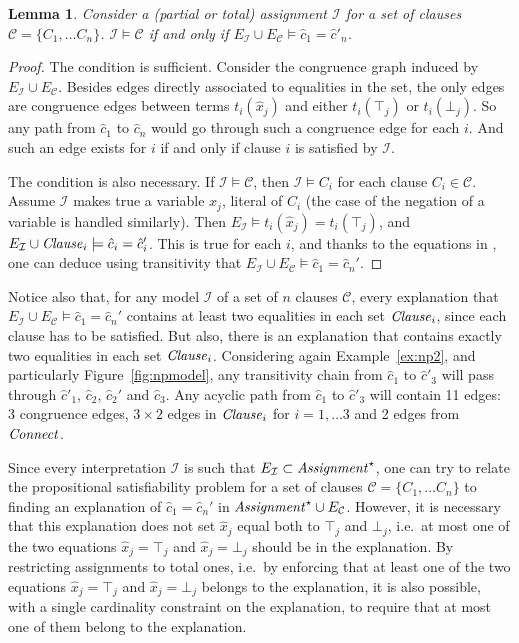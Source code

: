 \documentclass{easychair}
\newtheorem{lemma}{Lemma}
\begin{document}
\begin{lemma}
\label{lemma:eqv}
Consider a (partial or total) assignment $\mathcal{I}$ for a set of clauses
$\mathcal{C}= \{C_1, \dots C_n\}$.  $\mathcal{I} \models \mathcal{C}$ if and only if
$E_{\mathcal{I}} \cup E_\mathcal{C} \models \hat{c}_1 = \hat{c}'_n$.
\end{lemma}
\begin{proof}
The condition is sufficient.  Consider the congruence graph induced by
$E_{\mathcal{I}} \cup E_\mathcal{C}$.  Besides edges directly associated to
equalities in the set, the only edges are congruence edges between terms
$t_i(\hat{x}_j)$ and either $t_i(\top_j)$ or $t_i(\bot_j)$.  So any path from
$\hat{c}_1$ to $\hat{c}_n$ would go through such a congruence edge for each $i$.
And such an edge exists for $i$ if and only if clause $i$ is satisfied by
$\mathcal{I}$.

The condition is also necessary.  If $\mathcal{I} \models \mathcal{C}$, then
$\mathcal{I} \models C_i$ for each clause $C_i \in \mathcal{C}$.  Assume
$\mathcal{I}$ makes true a variable $x_j$, literal of $C_i$ (the case of
the negation of a variable is handled similarly).  Then $E_{\mathcal{I}} \models
t_i(\hat{x}_j) = t_i(\top_j)$, and $E_{\mathcal{I}} \cup {\it Clause}_i
\models \hat{c}_i = \hat{c}_i'$.  This is true for each $i$, and
thanks to the equations in \Connect, one can deduce using transitivity that
$E_{\mathcal{I}} \cup E_\mathcal{C} \models \hat{c}_1 = \hat{c}_n'$.
\end{proof}

\noindent Notice also that, for any model $\mathcal{I}$ of a set of $n$ clauses
$\mathcal{C}$, every explanation that $E_{\mathcal{I}} \cup E_\mathcal{C}
\models \hat{c}_1 = \hat{c}_n'$ contains at least two equalities in
each set ${\it Clause}_i$, since each clause has to be satisfied.  But also, there is
an explanation that contains exactly two equalities in each set ${\it Clause}_i$.
Considering again Example~\ref{ex:np2}, and particularly
Figure~\ref{fig:npmodel}, any transitivity chain from $\hat{c}_1$ to
$\hat{c}'_3$ will pass through $\hat{c}'_1$, $\hat{c}_2$, $\hat{c}_2'$ and
$\hat{c}_3$.  Any acyclic path from $\hat{c}_1$ to $\hat{c}'_3$ will contain 11
edges: 3 congruence edges, $3\times 2$ edges in ${\it Clause}_i$ for $i=1,\dots 3$
and 2 edges from ${\it Connect}$.

Since every interpretation $\mathcal{I}$ is such that $E_{\mathcal{I}} \subset
{\it Assignment}^\star$, one can try to relate the propositional satisfiability
problem for a set of clauses $\mathcal{C}= \{C_1, \dots C_n\}$ to finding an
explanation of $\hat{c}_1 = \hat{c}_n'$ in ${\it Assignment}^\star \cup
E_{\mathcal{C}}$.  However, it is necessary that this explanation does not set
$\hat{x}_j$ equal both to $\top_j$ and $\bot_j$, i.e.\ at most one of the two
equations $\hat{x}_j = \top_j$ and $\hat{x}_j = \bot_j$ should be in the
explanation.  By restricting assignments to total ones, i.e.\ by enforcing that
at least one of the two equations $\hat{x}_j = \top_j$ and $\hat{x}_j = \bot_j$
belongs to the explanation, it is also possible, with a single cardinality
constraint on the explanation, to require that at most one of them belong to the
explanation.
\end{document}

